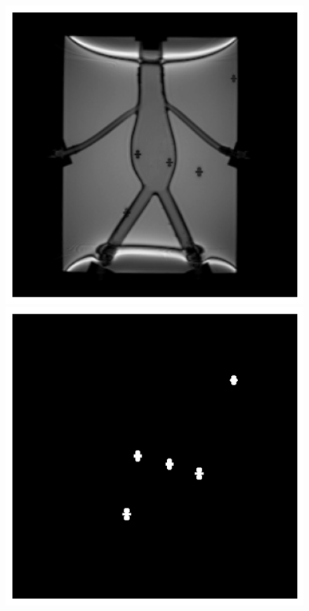 \documentclass[conference]{IEEEtran}
\begin{document}
\begin{figure}[h]
    \centering
    \begin{minipage}{0.241\textwidth}
        \centering
        \includegraphics[width=\textwidth]{Conference/img/generated-image.png}
    \end{minipage}\hfill \hspace*{0cm}
    \begin{minipage}{0.241\textwidth}
        \centering
        \includegraphics[width=\textwidth]{Conference/img/generated-image-truth.png}

\end{minipage}
\end{figure}
\end{document}
